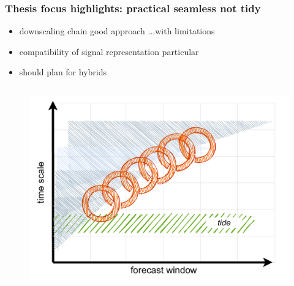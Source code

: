 \begin{frame}
\frametitle{Thesis focus highlights: practical seamless not tidy}
\begin{minipage}{1.0\textwidth}
    \begin{itemize}
        \item downscaling chain good approach ...with limitations
        \item compatibility of signal representation particular 
        \item should plan for hybrids
    \end{itemize}
\end{minipage}
\hfill
\begin{minipage}{1.0\textwidth}
\begin{columns}
    \begin{column}{0.4\textwidth}
    \begin{figure}      
        \includegraphics[width=\textwidth]{figures/diagrams/scales_with_chain.pdf}
    \end{figure}
    \end{column}


\end{columns}
\end{minipage}
\end{frame}
